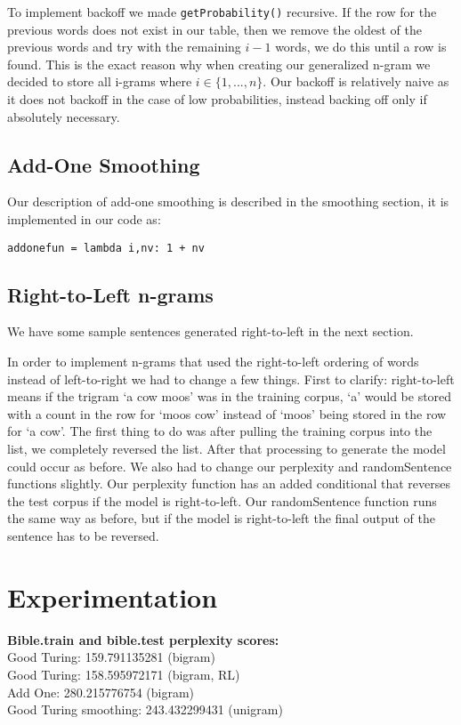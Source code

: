 \documentclass{article}
\begin{document}
To implement backoff we made \texttt{getProbability()} recursive. If the row for the previous words does not exist in our table, then we remove the oldest of the previous words and try with the remaining $i-1$ words, we do this until a row is found. This is the exact reason why when creating our generalized n-gram we decided to store all i-grams where $i \in \lbrace 1,...,n \rbrace$. Our backoff is relatively naive as it does not backoff in the case of low probabilities, instead backing off only if absolutely necessary.

\subsection{Add-One Smoothing}
Our description of add-one smoothing is described in the smoothing section, it is implemented in our code as: \begin{verbatim}
addonefun = lambda i,nv: 1 + nv
\end{verbatim}

\subsection{Right-to-Left n-grams}
We have some sample sentences generated right-to-left in the next section.\par
In order to implement n-grams that used the right-to-left ordering of words instead of left-to-right we had to change a few things. First to clarify: right-to-left means if the trigram `a cow moos' was in the training corpus, `a' would be stored with a count in the row for `moos cow' instead of `moos' being stored in the row for `a cow'. The first thing to do was after pulling the training corpus into the list, we completely reversed the list. After that processing to generate the model could occur as before. We also had to change our perplexity and randomSentence functions slightly. Our perplexity function has an added conditional that reverses the test corpus if the model is right-to-left. Our randomSentence function runs the same way as before, but if the model is right-to-left the final output of the sentence has to be reversed.

\section{Experimentation}

\textbf{Bible.train and bible.test perplexity scores:}\\
Good Turing: 159.791135281 (bigram)\\
Good Turing: 158.595972171 (bigram, RL)\\
Add One: 280.215776754 (bigram)\\
Good Turing smoothing: 243.432299431 (unigram)\par
\end{document}
